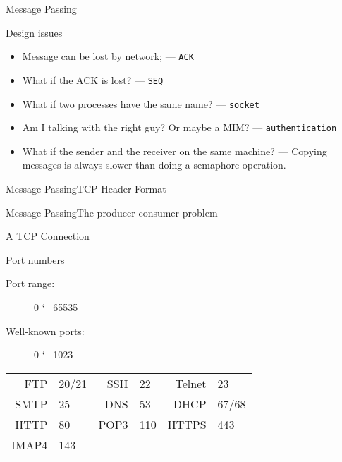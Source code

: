 \begin{frame}{Message Passing}
  \begin{block}{Design issues}
    \begin{itemize}
    \item Message can be lost by network; --- \texttt{ACK}
    \item What if the ACK is lost? --- \texttt{SEQ}
    \item What if two processes have the same name? --- \texttt{socket}
    \item Am I talking with the right guy? Or maybe a MIM? --- \texttt{authentication}
    \item What if the sender and the receiver on the same machine? --- Copying messages is
      always slower than doing a semaphore operation.
    \end{itemize}
  \end{block}
\end{frame}

\begin{frame}{Message Passing}{TCP Header Format}
  \begin{center}
  \end{center}
\end{frame}

\begin{frame}{Message Passing}{The producer-consumer problem}
  \centering
\end{frame}

\begin{frame}{A TCP Connection}
  \begin{center}
  \end{center}
  \begin{block}{Port numbers}
    \begin{description}
    \item[Port range:] 0 \char`~{} 65535
    \item[Well-known ports:] 0 \char`~{} 1023
    \end{description}
    \begin{center}
      \begin{tabular}{rl|rl|rl}
        FTP &20/21&SSH&22&Telnet&23\\
        SMTP&25 &DNS&53&DHCP &67/68\\
        HTTP&80 &POP3&110&HTTPS&443\\
        IMAP4&143&&&&
      \end{tabular}
    \end{center}
  \end{block}
\end{frame}

